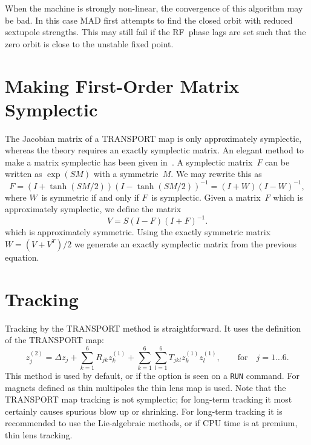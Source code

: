 When the machine is strongly non-linear, the convergence of this
algorithm may be bad.
In this case MAD first attempts to find the closed orbit with reduced
sextupole strengths.
This may still fail if the RF~phase lags are set such that the zero
orbit is close to the unstable fixed point.
 
 
\section{Making First-Order Matrix Symplectic}
\label{symplectify}
The Jacobian matrix of a TRANSPORT map is only approximately symplectic,
whereas the theory requires an exactly symplectic matrix.
An elegant method to make a matrix symplectic has been given in~\cite{HEA86}.
A symplectic matrix~$F$ can be written as $\exp(SM)$ with a
symmetric~$M$.
We may rewrite this as
\begin{equation}
F = (I + \tanh(SM/2))(I - \tanh(SM/2))^{-1} = (I + W)(I - W)^{-1},
\end{equation}
where $W$~is symmetric if and only if $F$~is symplectic.
Given a matrix~$F$ which is approximately symplectic,
we define the matrix
\begin{equation}
V = S (I - F)(I + F)^{-1}.
\end{equation}
which is approximately symmetric.
Using the exactly symmetric matrix $W = (V + V^T) / 2$ we generate an
exactly symplectic matrix from the previous equation.
 
 
\section{Tracking}
Tracking by the TRANSPORT method is straightforward.
It uses the definition of the TRANSPORT map:
\begin{equation}
z^{(2)}_j = \Delta z_j + \sum_{k=1}^6 R_{jk} z^{(1)}_k
          + \sum_{k=1}^6 \sum_{l=1}^6 T_{jkl} z^{(1)}_k z^{(1)}_l,
          \qquad \mathrm{for} \quad j = 1 \ldots 6.
\end{equation}
This method is used by default, or if the option
is seen on a {\tt RUN} command.
For magnets defined as thin multipoles the thin lens map is used.
Note that the TRANSPORT map tracking is not symplectic;
for long-term tracking it most certainly causes spurious blow up or
shrinking.
For long-term tracking it is recommended to use the Lie-algebraic
methods, or if CPU time is at premium, thin lens tracking.
 
